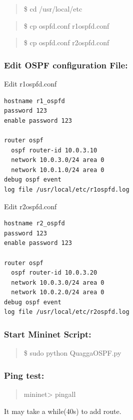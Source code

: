 \begin{quote}
\$ cd /usr/local/etc
\end{quote}

\begin{quote}
\$ cp ospfd.conf r1ospfd.conf
\end{quote}

\begin{quote}
\$ cp ospfd.conf r2ospfd.conf
\end{quote}

\subsubsection{Edit OSPF configuration
File:}\label{edit-ospf-configuration-file}

Edit r1ospfd.conf

\begin{verbatim}
hostname r1_ospfd
password 123
enable password 123

router ospf
  ospf router-id 10.0.3.10
  network 10.0.3.0/24 area 0
  network 10.0.1.0/24 area 0
debug ospf event
log file /usr/local/etc/r1ospfd.log
\end{verbatim}

Edit r2ospfd.conf

\begin{verbatim}
hostname r2_ospfd
password 123
enable password 123

router ospf
  ospf router-id 10.0.3.20
  network 10.0.3.0/24 area 0
  network 10.0.2.0/24 area 0
debug ospf event
log file /usr/local/etc/r2ospfd.log
\end{verbatim}

\subsubsection{Start Mininet Script:}\label{start-mininet-script}

\begin{quote}
\$ sudo python QuaggaOSPF.py
\end{quote}

\subsubsection{Ping test:}\label{ping-test}

\begin{quote}
mininet\textgreater{} pingall
\end{quote}

It may take a while(40s) to add route.

